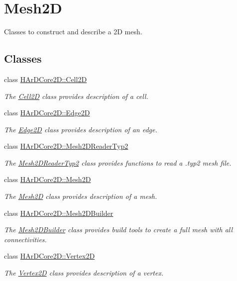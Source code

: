 \hypertarget{group__Mesh2D}{}\section{Mesh2D}
\label{group__Mesh2D}


Classes to construct and describe a 2D mesh.  


\subsection*{Classes}
\begin{DoxyCompactItemize}
\item 
class \hyperlink{classHArDCore2D_1_1Cell2D}{H\+Ar\+D\+Core2\+D\+::\+Cell2D}
\begin{DoxyCompactList}\small\item\em The \hyperlink{classHArDCore2D_1_1Cell2D}{Cell2D} class provides description of a cell. \end{DoxyCompactList}\item 
class \hyperlink{classHArDCore2D_1_1Edge2D}{H\+Ar\+D\+Core2\+D\+::\+Edge2D}
\begin{DoxyCompactList}\small\item\em The \hyperlink{classHArDCore2D_1_1Edge2D}{Edge2D} class provides description of an edge. \end{DoxyCompactList}\item 
class \hyperlink{classHArDCore2D_1_1Mesh2DReaderTyp2}{H\+Ar\+D\+Core2\+D\+::\+Mesh2\+D\+Reader\+Typ2}
\begin{DoxyCompactList}\small\item\em The \hyperlink{classHArDCore2D_1_1Mesh2DReaderTyp2}{Mesh2\+D\+Reader\+Typ2} class provides functions to read a .typ2 mesh file. \end{DoxyCompactList}\item 
class \hyperlink{classHArDCore2D_1_1Mesh2D}{H\+Ar\+D\+Core2\+D\+::\+Mesh2D}
\begin{DoxyCompactList}\small\item\em The \hyperlink{classHArDCore2D_1_1Mesh2D}{Mesh2D} class provides description of a mesh. \end{DoxyCompactList}\item 
class \hyperlink{classHArDCore2D_1_1Mesh2DBuilder}{H\+Ar\+D\+Core2\+D\+::\+Mesh2\+D\+Builder}
\begin{DoxyCompactList}\small\item\em The \hyperlink{classHArDCore2D_1_1Mesh2DBuilder}{Mesh2\+D\+Builder} class provides build tools to create a full mesh with all connectivities. \end{DoxyCompactList}\item 
class \hyperlink{classHArDCore2D_1_1Vertex2D}{H\+Ar\+D\+Core2\+D\+::\+Vertex2D}
\begin{DoxyCompactList}\small\item\em The \hyperlink{classHArDCore2D_1_1Vertex2D}{Vertex2D} class provides description of a vertex. \end{DoxyCompactList}\end{DoxyCompactItemize}
